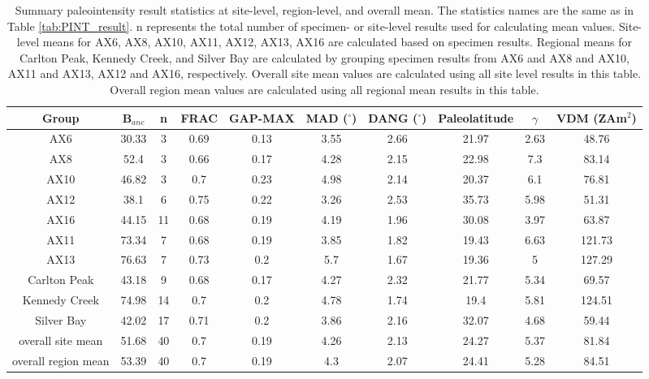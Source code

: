 \documentclass[9pt,twoside,lineno]{pnas-new}
\begin{document}
\clearpage

\begin{table}[]
\centering
\caption{\footnotesize{Summary paleointensity result statistics at site-level, region-level, and overall mean. The statistics names are the same as in Table \ref{tab:PINT_result}}. n represents the total number of specimen- or site-level results used for calculating mean values. Site-level means for AX6, AX8, AX10, AX11, AX12, AX13, AX16 are calculated based on specimen results. Regional means for Carlton Peak, Kennedy Creek, and Silver Bay are calculated by grouping specimen results from AX6 and AX8 and AX10, AX11 and AX13, AX12 and AX16, respectively. Overall site mean values are calculated using all site level results in this table. Overall region mean values are calculated using all regional mean results in this table. }
\begin{tabular}{cccccccccc}
\hline
Group                & B$_{anc}$ & n  & FRAC & GAP-MAX & MAD ($^\circ$) & DANG ($^\circ$) & Paleolatitude & $\gamma$ & VDM (ZAm$^2$) \\
\hline
AX6                 & 30.33     & 3  & 0.69 & 0.13    & 3.55           & 2.66            & 21.97         & 2.63     & 48.76         \\
AX8                 & 52.4      & 3  & 0.66 & 0.17    & 4.28           & 2.15            & 22.98         & 7.3      & 83.14         \\
AX10                & 46.82     & 3  & 0.7  & 0.23    & 4.98           & 2.14            & 20.37         & 6.1      & 76.81         \\
AX12                & 38.1      & 6  & 0.75 & 0.22    & 3.26           & 2.53            & 35.73         & 5.98     & 51.31         \\
AX16                & 44.15     & 11 & 0.68 & 0.19    & 4.19           & 1.96            & 30.08         & 3.97     & 63.87         \\
AX11                & 73.34     & 7  & 0.68 & 0.19    & 3.85           & 1.82            & 19.43         & 6.63     & 121.73        \\
AX13                & 76.63     & 7  & 0.73 & 0.2     & 5.7            & 1.67            & 19.36         & 5        & 127.29        \\
Carlton Peak        & 43.18     & 9  & 0.68 & 0.17    & 4.27           & 2.32            & 21.77         & 5.34     & 69.57         \\
Kennedy Creek       & 74.98     & 14 & 0.7  & 0.2     & 4.78           & 1.74            & 19.4          & 5.81     & 124.51        \\
Silver Bay          & 42.02     & 17 & 0.71 & 0.2     & 3.86           & 2.16            & 32.07         & 4.68     & 59.44         \\
overall site mean   & 51.68     & 40 & 0.7  & 0.19    & 4.26           & 2.13            & 24.27         & 5.37     & 81.84         \\
overall region mean & 53.39     & 40 & 0.7  & 0.19    & 4.3            & 2.07            & 24.41         & 5.28     & 84.51        \\
\hline
\end{tabular}
\end{table}
\end{document}
